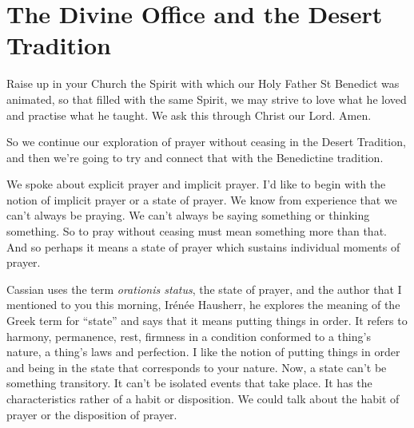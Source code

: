 \chapter{The Divine Office and the Desert Tradition}

\begin{itshape}
Raise up in your Church the Spirit with which our Holy Father St Benedict was animated, so that filled with the same Spirit, we may strive to love what he loved and practise what he taught. We ask this through Christ our Lord. Amen.
\end{itshape}

\smallskip

So we continue our exploration of prayer without ceasing in the Desert Tradition, and then we're going to try and connect that with the Benedictine tradition.

We spoke about explicit prayer and implicit prayer. I'd like to begin with the notion of implicit prayer or a state of prayer. We know from experience that we can't always be praying. We can't always be saying something or thinking something. So to pray without ceasing must mean something more than that. And so perhaps it means a state of prayer which sustains individual moments of prayer.

Cassian uses the term \emph{orationis status}, the state of prayer, and the author that I mentioned to you this morning, Ir\'{e}n\'{e}e Hausherr, he explores the meaning of the Greek term for ``state'' and says that it means putting things in order. It refers to harmony, permanence, rest, firmness in a condition conformed to a thing's nature, a thing's laws and perfection. I like the notion of putting things in order and being in the state that corresponds to your nature. Now, a state can't be something transitory. It can't be isolated events that take place. It has the characteristics rather of a habit or disposition. We could talk about the habit of prayer or the disposition of prayer.

